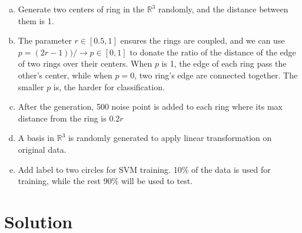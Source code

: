 \documentclass{article}
\begin{document}
\begin{enumerate}[(a)]
    \item Generate two centers of ring in the $\mathbb{R}^3$ randomly, and the distance between them is 1.
    \item The parameter $r\in[0.5,1]$ ensures the rings are coupled, and we can use $p=(2r-1))/\rightarrow p\in[0,1]$ to donate the ratio of the distance of the edge of two rings over their centers. When $p$ is 1, the edge of each ring pass the other's center, while when $p=0$, two ring's edge are connected together.  The smaller $p$ is, the harder for classification.
    \item After the generation, 500 noise point is added to each ring where its max distance from the ring is $0.2r$
    \item A basis in $\mathbb{R}^3$ is randomly generated to apply linear transformation on original data.
    \item Add label to two circles for SVM training. 10\% of the data is used for training, while the rest 90\% will be used to test.
\end{enumerate}
\section{Solution}
\end{document}
